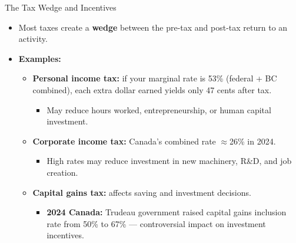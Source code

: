 \documentclass[aspectratio=169]{beamer}
\begin{document}
\begin{frame}{The Tax Wedge and Incentives}
\transfade
\begin{itemize}[<+->]
  \item Most taxes create a \textbf{wedge} between the pre-tax and post-tax return to an activity.
  \item \textbf{Examples:}
  \begin{itemize}[<+->]
    \item \textbf{Personal income tax:} if your marginal rate is 53\% (federal + BC combined), each extra dollar earned yields only 47 cents after tax.
    \begin{itemize}[<+->]
      \item May reduce hours worked, entrepreneurship, or human capital investment.
    \end{itemize}
    \item \textbf{Corporate income tax:} Canada's combined rate $\approx$26\% in 2024.
    \begin{itemize}[<+->]
      \item High rates may reduce investment in new machinery, R\&D, and job creation.
    \end{itemize}
    \item \textbf{Capital gains tax:} affects saving and investment decisions.
    \begin{itemize}[<+->]
      \item \textbf{2024 Canada:} Trudeau government raised capital gains inclusion rate from 50\% to 67\% --- controversial impact on investment incentives.
    \end{itemize}
  \end{itemize}
\end{itemize}
\end{frame}
\end{document}
